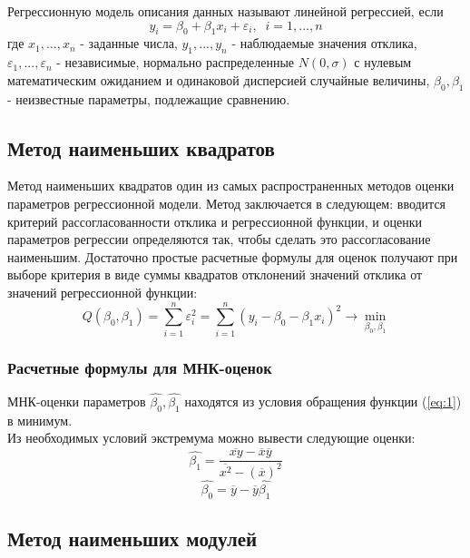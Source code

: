 \documentclass{article}
\begin{document}
Регрессионную модель описания данных называют линейной регрессией, если
$$
y_i = \beta_0 + \beta_1x_i+\varepsilon_i, \;\; i=1,...,n
$$
где $x_1,...,x_n$ - заданные числа, $y_1,...,y_n$ - наблюдаемые значения отклика, $\varepsilon_1,...,\varepsilon_n$ - независимые, нормально распределенные $N(0, \sigma)$ с нулевым математическим ожиданием и одинаковой дисперсией случайные величины, $\beta_0, \beta_1$ - неизвестные параметры, подлежащие сравнению.

\subsection{Метод наименьших квадратов}

Метод наименьших квадратов один из самых распространенных методов оценки параметров регрессионной модели. Метод заключается в следующем: вводится критерий рассогласованности отклика и регрессионной функции, и оценки параметров регрессии определяются так, чтобы сделать это рассогласование наименьшим. Достаточно простые расчетные формулы для оценок получают при выборе критерия в виде суммы квадратов отклонений значений отклика от значений регрессионной функции:
\begin{equation}
Q(\beta_0, \beta_1) = \sum^n_{i=1} \varepsilon^2_i = \sum^n_{i=1}(y_i - \beta_0 - \beta_1x_i)^2 \to \min_{\beta_0, \beta_1}
\label{eq:1}
\end{equation}

\subsubsection{Расчетные формулы для МНК-оценок}

МНК-оценки параметров $\widehat{\beta_0},\widehat{\beta_1}$ находятся из условия обращения функции (\ref{eq:1}) в минимум. \\

Из необходимых условий экстремума можно вывести следующие оценки:
\begin{equation}
\widehat{\beta_1} = \frac{\overline{xy} - \overline{x}\overline{y}}{\overline{x^2} - (\overline{x})^2}
\label{eq:2}
\end{equation}
\begin{equation}
\widehat{\beta_0} = \overline{y} - \overline{y}\widehat{\beta_1}
\label{eq:3}
\end{equation}

\subsection{Метод наименьших модулей}
\end{document}
